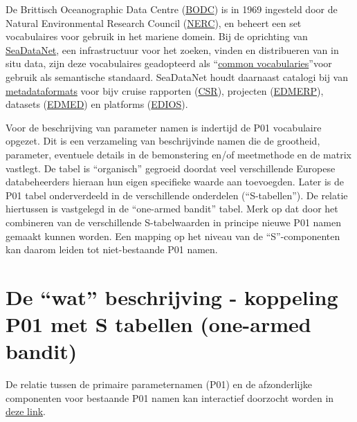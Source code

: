 \documentclass[
]{book}
\begin{document}
De Brittisch Oceanographic Data Centre (\href{https://www.bodc.ac.uk/}{BODC}) is in 1969 ingesteld door de Natural Environmental Research Council (\href{https://www.ukri.org/councils/nerc/}{NERC}), en beheert een set vocabulaires voor gebruik in het mariene domein. Bij de oprichting van \href{https://www.seadatanet.org/}{SeaDataNet}, een infrastructuur voor het zoeken, vinden en distribueren van in situ data, zijn deze vocabulaires geadopteerd als ``\href{https://www.seadatanet.org/Standards/Common-Vocabularies}{common vocabularies}''voor gebruik als semantische standaard. SeaDataNet houdt daarnaast catalogi bij van \href{https://www.seadatanet.org/Standards/Metadata-formats}{metadataformats} voor bijv cruise rapporten (\href{https://www.seadatanet.org/Standards/Metadata-formats/CSR}{CSR}), projecten (\href{https://www.seadatanet.org/Standards/Metadata-formats/EDMERP}{EDMERP}), datasets (\href{https://www.seadatanet.org/Standards/Metadata-formats/EDMED}{EDMED}) en platforms (\href{https://www.seadatanet.org/Standards/Metadata-formats/EDIOS}{EDIOS}).

Voor de beschrijving van parameter namen is indertijd de P01 vocabulaire opgezet. Dit is een verzameling van beschrijvinde namen die de grootheid, parameter, eventuele details in de bemonstering en/of meetmethode en de matrix vastlegt. De tabel is ``organisch'' gegroeid doordat veel verschillende Europese databeheerders hieraan hun eigen specifieke waarde aan toevoegden. Later is de P01 tabel onderverdeeld in de verschillende onderdelen (``S-tabellen''). De relatie hiertussen is vastgelegd in de ``one-armed bandit'' tabel. Merk op dat door het combineren van de verschillende S-tabelwaarden in principe nieuwe P01 namen gemaakt kunnen worden. Een mapping op het niveau van de ``S''-componenten kan daarom leiden tot niet-bestaande P01 namen.

\hypertarget{de-wat-beschrijving---koppeling-p01-met-s-tabellen-one-armed-bandit}{%
\section{De ``wat'' beschrijving - koppeling P01 met S tabellen (one-armed bandit)}\label{de-wat-beschrijving---koppeling-p01-met-s-tabellen-one-armed-bandit}}

De relatie tussen de primaire parameternamen (P01) en de afzonderlijke componenten voor bestaande P01 namen kan interactief doorzocht worden in \href{https://vocab.seadatanet.org/p01-facet-search?\&step_more=6}{deze link}.
\end{document}
